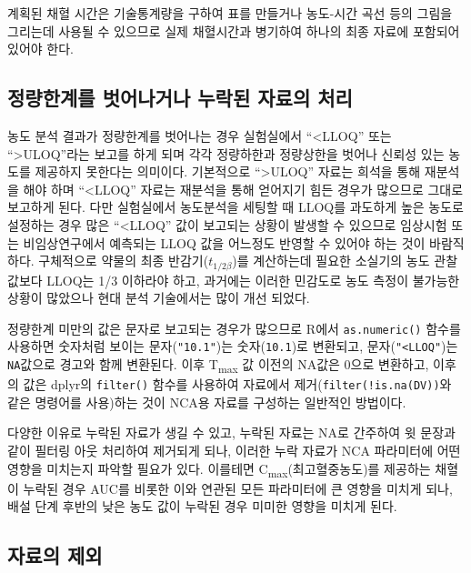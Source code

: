 \documentclass[
  11pt,
  krantz2, a4paper, twoside]{krantz}
\theoremstyle{definition}
\theoremstyle{definition}
\theoremstyle{definition}
\theoremstyle{definition}
\theoremstyle{remark}
\begin{document}
계획된 채혈 시간은 기술통계량을 구하여 표를 만들거나 농도-시간 곡선 등의 그림을 그리는데 사용될 수 있으므로 실제 채혈시간과 병기하여 하나의 최종 자료에 포함되어 있어야 한다.

\hypertarget{uxc815uxb7c9uxd55cuxacc4uxb97c-uxbc97uxc5b4uxb098uxac70uxb098-uxb204uxb77duxb41c-uxc790uxb8ccuxc758-uxcc98uxb9ac}{%
\subsection{정량한계를 벗어나거나 누락된 자료의 처리}\label{uxc815uxb7c9uxd55cuxacc4uxb97c-uxbc97uxc5b4uxb098uxac70uxb098-uxb204uxb77duxb41c-uxc790uxb8ccuxc758-uxcc98uxb9ac}}

농도 분석 결과가 정량한계를 벗어나는 경우 실험실에서 ``\textless LLOQ'' 또는 ``\textgreater ULOQ''라는 보고를 하게 되며 각각 정량하한과 정량상한을 벗어나 신뢰성 있는 농도를 제공하지 못한다는 의미이다. 기본적으로 ``\textgreater ULOQ'' 자료는 희석을 통해 재분석을 해야 하며 ``\textless LLOQ'' 자료는 재분석을 통해 얻어지기 힘든 경우가 많으므로 그대로 보고하게 된다. 다만 실험실에서 농도분석을 세팅할 때 LLOQ를 과도하게 높은 농도로 설정하는 경우 많은 ``\textless LLOQ'' 값이 보고되는 상황이 발생할 수 있으므로 임상시험 또는 비임상연구에서 예측되는 LLOQ 값을 어느정도 반영할 수 있어야 하는 것이 바람직하다. 구체적으로 약물의 최종 반감기(\(t_{1/2\beta}\))를 계산하는데 필요한 소실기의 농도 관찰값보다 LLOQ는 1/3 이하라야 하고, 과거에는 이러한 민감도로 농도 측정이 불가능한 상황이 많았으나 현대 분석 기술에서는 많이 개선 되었다.

정량한계 미만의 값은 문자로 보고되는 경우가 많으므로 R에서 \texttt{as.numeric()} 함수를 사용하면 숫자처럼 보이는 문자(\texttt{"10.1"})는 숫자(\texttt{10.1})로 변환되고, 문자(\texttt{"\textless{}LLOQ"})는 \texttt{NA}값으로 경고와 함께 변환된다. 이후 T\textsubscript{max} 값 이전의 NA값은 0으로 변환하고, 이후의 값은 dplyr의 \texttt{filter()} 함수를 사용하여 자료에서 제거(\texttt{filter(!is.na(DV))}와 같은 명령어를 사용)하는 것이 NCA용 자료를 구성하는 일반적인 방법이다.

다양한 이유로 누락된 자료가 생길 수 있고, 누락된 자료는 NA로 간주하여 윗 문장과 같이 필터링 아웃 처리하여 제거되게 되나, 이러한 누락 자료가 NCA 파라미터에 어떤 영향을 미치는지 파악할 필요가 있다. 이를테면 C\textsubscript{max}(최고혈중농도)를 제공하는 채혈이 누락된 경우 AUC를 비롯한 이와 연관된 모든 파라미터에 큰 영향을 미치게 되나, 배설 단계 후반의 낮은 농도 값이 누락된 경우 미미한 영향을 미치게 된다.

\hypertarget{uxc790uxb8ccuxc758-uxc81cuxc678}{%
\subsection{자료의 제외}\label{uxc790uxb8ccuxc758-uxc81cuxc678}}
\end{document}
